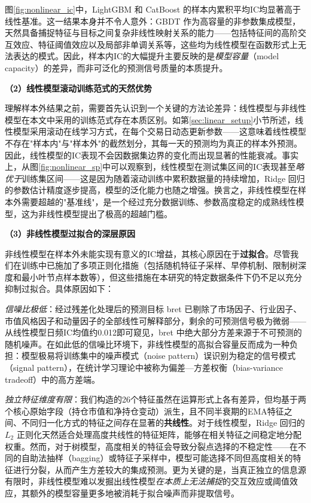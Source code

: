 \documentclass{article}
\begin{document}
图\ref{fig:nonlinear_ic}中，LightGBM 和 CatBoost 的样本内累积平均IC均显著高于线性基准。这一结果本身并不令人意外：GBDT 作为高容量的非参数集成模型，天然具备捕捉特征与目标之间复杂非线性映射关系的能力——包括特征间的高阶交互效应、特征阈值效应以及局部非单调关系等，这些均为线性模型在函数形式上无法表达的模式。因此，样本内IC的大幅提升主要反映的是\textit{模型容量}（model capacity）的差异，而非可泛化的预测信号质量的本质提升。

\vspace{0.3em}
\noindent\textbf{（2）线性模型滚动训练范式的天然优势}

理解样本外结果之前，需要首先认识到一个关键的方法论差异：线性模型与非线性模型在本文中采用的训练范式存在本质区别。如第\ref{sec:linear_setup}小节所述，线性模型采用滚动在线学习方式，在每个交易日动态更新参数——这意味着线性模型不存在"样本内"与"样本外"的截然划分，其每一天的预测均为真正的样本外预测。因此，线性模型的IC表现不会因数据集边界的变化而出现显著的性能衰减。事实上，从图\ref{fig:nonlinear_sp}中可以观察到，线性模型在测试集区间的IC表现甚至\textit{略优于}训练集区间——这是因为随着滚动训练中累积数据量的持续增加，Ridge 回归的参数估计精度逐步提高，模型的泛化能力也随之增强。换言之，非线性模型在样本外需要超越的"基准线"，是一个经过充分数据训练、参数高度稳定的成熟线性模型，这为非线性模型提出了极高的超越门槛。

\vspace{0.3em}
\noindent\textbf{（3）非线性模型过拟合的深层原因}

非线性模型在样本外未能实现有意义的IC增益，其核心原因在于\textbf{过拟合}。尽管我们在训练中已施加了多项正则化措施（包括随机特征子采样、早停机制、限制树深度和最小叶节点样本数等），但这些措施在本研究的特定数据条件下仍不足以充分抑制过拟合。具体原因如下：

\textit{信噪比极低}：经过残差化处理后的预测目标 bret 已剔除了市场因子、行业因子、市值风格因子和动量因子的全部线性可解释部分，剩余的可预测信号极为微弱——从线性模型日频IC均值约0.012即可窥见，bret 中绝大部分方差来源于不可预测的随机噪声。在如此低的信噪比环境下，非线性模型的高拟合容量反而成为一种负担：模型极易将训练集中的噪声模式（noise pattern）误识别为稳定的信号模式（signal pattern），在统计学习理论中被称为偏差—方差权衡（bias-variance tradeoff）中的高方差端。

\textit{独立特征维度有限}：我们构造的26个特征虽然在运算形式上各有差异，但均基于两个核心原始字段（持仓市值和净持仓变动）派生，且不同半衰期的EMA特征之间、不同归一化方式的特征之间存在显著的\textbf{共线性}。对于线性模型，Ridge 回归的 $L_2$ 正则化天然适合处理高度共线性的特征矩阵，能够在相关特征之间稳定地分配权重。然而，对于树模型，高度相关的特征会导致分裂点选择的不稳定性——在不同的自助法抽样（bagging）或特征子采样中，模型可能选择不同但高度相关的特征进行分裂，从而产生方差较大的集成预测。更为关键的是，当真正独立的信息源有限时，非线性模型难以发掘出线性模型\textit{在本质上无法捕捉}的交互效应或阈值效应，其额外的模型容量更多地被消耗于拟合噪声而非提取信号。
\end{document}
